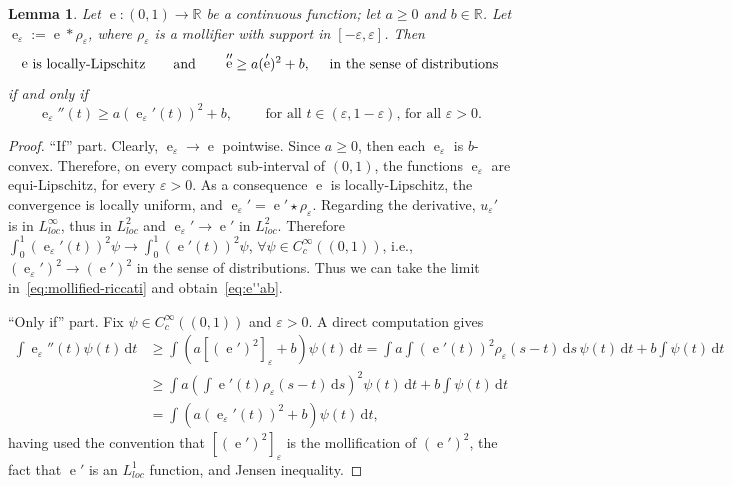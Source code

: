\documentclass[12pt,a4paper]{amsart}
\theoremstyle{plain}
\newtheorem{lemma}{Lemma}[section]
\theoremstyle{definition}
\numberwithin{equation}{section}
\let\temp\phi
\let\phi\varphi
\let\temp\epsilon
\let\epsilon\varepsilon
\let\varepsilon\temp
\newcommand{\R}{\mathbb{R}}
\DeclareMathOperator{\ee}{e}
\newcommand{\de}{{\mathrm{d}}}
\begin{document}
\begin{lemma}
  \label{lem:approximate-riccati}
  Let $\ee:(0,1)\to\R$ be a continuous function; let $a\geq 0$ and $b\in\R$.
  Let $\ee_\epsilon:=\ee*\rho_\epsilon$, where $\rho_\epsilon$ is a
  mollifier with support in $[-\epsilon,\epsilon]$.
  Then 
  \begin{equation}\label{eq:e''ab}
  \text{$\ee$ is locally-Lipschitz\qquad and\qquad }
    \ee''
    \geq a (\ee')^2
    + b
    ,
    \quad
    \text{ in the sense of distributions}
  \end{equation}
  if and only if
  \begin{equation}
    \label{eq:mollified-riccati}
    \ee_\epsilon''(t)
    \geq a (\ee_\epsilon'(t))^2
    + b
    ,
    \qquad
    \text{ for all $t\in(\epsilon,1-\epsilon)$, for all }\epsilon>0
    .
  \end{equation}
\end{lemma}
\begin{proof}
  ``If'' part.\quad  
  Clearly, $\ee_\epsilon\to \ee$ pointwise.
  Since $a\geq 0$, then each $\ee_\epsilon$ is $b$-convex. 
  Therefore, on every compact sub-interval of $(0,1)$, the functions
  $\ee_\epsilon$ are equi-Lipschitz, 
  for every $\epsilon>0$.
  As a consequence $\ee$ is locally-Lipschitz, the convergence 
  is locally uniform, and $\ee_\epsilon'=\ee'\star\rho_\epsilon$.
  Regarding the derivative, $u_\epsilon'$ is in $L^\infty_{loc}$, thus in
  $L^2_{loc}$ and $\ee_\epsilon'\to \ee'$ in $L^2_{loc}$.
  Therefore
  $\int_0^1 (\ee_\epsilon'(t))^2 \psi \to\int_0^1 (\ee'(t))^2 \psi$,
  $\forall \psi\in C^\infty_c((0,1))$, i.e.,
  $(\ee_\epsilon')^2\to (\ee')^2$ in the sense of distributions.
  Thus we can take the limit in~\eqref{eq:mollified-riccati} and obtain~\eqref{eq:e''ab}.
  
``Only if'' part.
  \quad
  Fix $\psi\in C^{\infty}_c((0,1))$ and $\epsilon>0$.
  A direct computation gives
  \begin{align*}
    \int
    \ee_\epsilon''(t)
    \psi(t)
    \,
    \de t
    &
    \geq
      \int
      (
      a[(\ee')^2]_{\epsilon}
      +b
      )
      \psi(t)
    \,
    \de t
      =
    \int
      a
      \int (\ee'(t))^2
      \rho_{\epsilon}(s-t)
      \,\de s\, 
      \psi(t)
      \,\de t
      +b
      \int
    \psi(t)
    \,
      \de t
    \\
    &
      \geq
    \int
      a
      \left(
      \int \ee'(t)
      \rho_{\epsilon}(s-t)
      \,\de s
      \right)^2
      \psi(t)
      \,\de t
      +b
      \int
    \psi(t)
    \,
      \de t
    \\
    &
      =
      \int
      (
      a
      \left(
      \ee_\epsilon'(t)
      \right)^2
      +b)
      \psi(t)
    \,
      \de t
      ,
  \end{align*}
  having used the convention that $[(\ee')^2]_\epsilon$ is the
  mollification of $(\ee')^2$, the fact that $\ee'$ is an $L^1_{loc}$
  function, and Jensen inequality.
\end{proof}
\end{document}
